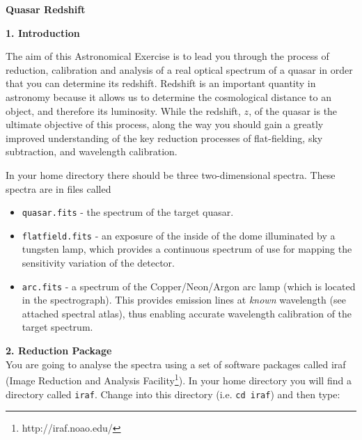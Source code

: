 \pagestyle{myheadings}
\setcounter{page}{1}

\begin{center}
{\Huge\bf Quasar Redshift}
\end{center}

\vspace{0.3cm}

{\large {\bf 1. Introduction}}

The aim of this Astronomical Exercise is to lead you through the process
of reduction, calibration and analysis of a real optical spectrum of a quasar 
in order that you can determine its redshift. Redshift is an important
quantity in astronomy because it allows us to determine the 
cosmological distance to an object, and therefore its luminosity.
While the redshift, $z$, of
the quasar is the ultimate objective of this process, along the way you
should gain a greatly improved understanding of the key reduction processes
of flat-fielding, sky subtraction, and wavelength calibration.

In your home directory there should be three two-dimensional spectra. 
These spectra are in files called
\begin{itemize}

\item{{\tt quasar.fits} - the spectrum of the target quasar.}

\item{{\tt flatfield.fits} - an exposure of the
inside of the dome illuminated by a tungsten lamp, which provides a
continuous spectrum of use for mapping the sensitivity variation of the
detector.} %

\item{{\tt arc.fits} - a spectrum of the Copper/Neon/Argon arc lamp (which
is located in the spectrograph). This provides emission lines at {\em
known} wavelength (see attached spectral atlas), thus enabling accurate
wavelength calibration of the target spectrum.}

\end{itemize}

{\large {\bf 2. Reduction Package}}\\
You are going to analyse the spectra using a set of software packages 
called {\sc iraf} (Image Reduction and Analysis
Facility\footnote{http://iraf.noao.edu/}). In your home directory you
will find a directory called {\tt iraf}. Change into this directory
(i.e. {\tt cd iraf}) and then type:

